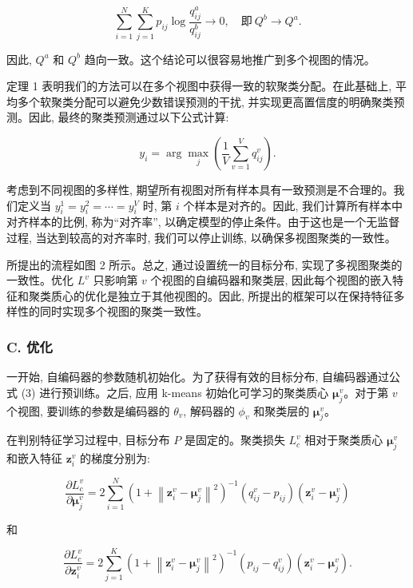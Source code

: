 \documentclass{article}
\begin{document}
\begin{equation}
    \sum_{i=1}^{N} \sum_{j=1}^{K} p_{ij} \log \frac{q^a_{ij}}{q^b_{ij}} \to 0, \quad 即 \ Q^b \to Q^a.
\end{equation}

因此, $Q^a$ 和 $Q^b$ 趋向一致。这个结论可以很容易地推广到多个视图的情况。

定理 1 表明我们的方法可以在多个视图中获得一致的软聚类分配。在此基础上, 平均多个软聚类分配可以避免少数错误预测的干扰, 并实现更高置信度的明确聚类预测。因此, 最终的聚类预测通过以下公式计算:

\begin{equation}
    y_i = \arg \max_j \left( \frac{1}{V} \sum_{v=1}^{V} q^v_{ij} \right).
\end{equation}

考虑到不同视图的多样性, 期望所有视图对所有样本具有一致预测是不合理的。我们定义当 $y^1_i = y^2_i = \cdots = y^V_i$ 时, 第 $i$ 个样本是对齐的。因此, 我们计算所有样本中对齐样本的比例, 称为“对齐率”, 以确定模型的停止条件。由于这也是一个无监督过程, 当达到较高的对齐率时, 我们可以停止训练, 以确保多视图聚类的一致性。

所提出的流程如图 2 所示。总之, 通过设置统一的目标分布, 实现了多视图聚类的一致性。优化 $L^v$ 只影响第 $v$ 个视图的自编码器和聚类层, 因此每个视图的嵌入特征和聚类质心的优化是独立于其他视图的。因此, 所提出的框架可以在保持特征多样性的同时实现多个视图的聚类一致性。


\subsubsection*{C. 优化}


一开始, 自编码器的参数随机初始化。为了获得有效的目标分布, 自编码器通过公式 (3) 进行预训练。之后, 应用 k-means 初始化可学习的聚类质心 $\boldsymbol{\mu}^v_j$。对于第 $v$ 个视图, 要训练的参数是编码器的 $\theta_v$, 解码器的 $\phi_v$ 和聚类层的 $\boldsymbol{\mu}^v_j$。

在判别特征学习过程中, 目标分布 $P$ 是固定的。聚类损失 $L^v_c$ 相对于聚类质心 $\boldsymbol{\mu}^v_j$ 和嵌入特征 $\mathbf{z}^v_i$ 的梯度分别为:

\begin{equation}
    \frac{\partial L^v_c}{\partial \boldsymbol{\mu}^v_j} = 2 \sum_{i=1}^{N} (1 + \left\| \mathbf{z}^v_i - \boldsymbol{\mu}^v_j \right\|^2)^{-1}(q^v_{ij} - p_{ij})(\mathbf{z}^v_i - \boldsymbol{\mu}^v_j)
\end{equation}

和

\begin{equation}
    \frac{\partial L^v_c}{\partial \mathbf{z}^v_i} = 2 \sum_{j=1}^{K} (1 + \left\| \mathbf{z}^v_i - \boldsymbol{\mu}^v_j \right\|^2)^{-1}(p_{ij} - q^v_{ij})(\mathbf{z}^v_i - \boldsymbol{\mu}^v_j).
\end{equation}
\end{document}

